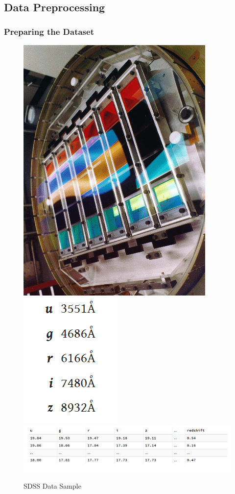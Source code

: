 \documentclass{beamer}
\begin{document}
\subsection{Data Preprocessing}
\begin{frame}
	\frametitle{Preparing the Dataset}
    \begin{figure}
	\includegraphics[scale=0.2]{img/SDSS_imaging_camera.jpg}
	\includegraphics[scale=0.5]{img/wavelengths.png}
        \includegraphics[scale=0.3]{img/sdss_data.png}
        \caption*{SDSS Data Sample}
    \end{figure}
    \end{frame}
\end{document}
